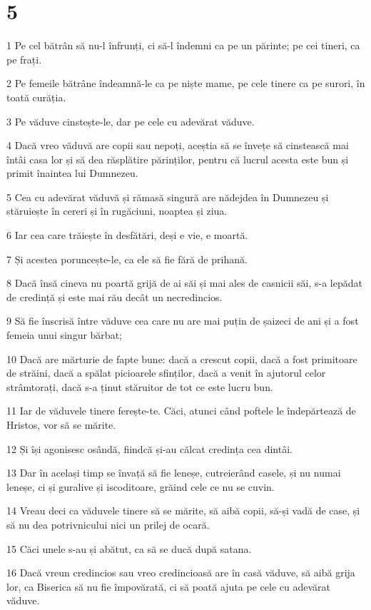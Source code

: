 \chapter{5}

\par 1 Pe cel bătrân să nu-l înfrunți, ci să-l îndemni ca pe un părinte; pe cei tineri, ca pe frați.
\par 2 Pe femeile bătrâne îndeamnă-le ca pe niște mame, pe cele tinere ca pe surori, în toată curăția.
\par 3 Pe văduve cinstește-le, dar pe cele cu adevărat văduve.
\par 4 Dacă vreo văduvă are copii sau nepoți, aceștia să se învețe să cinstească mai întâi casa lor și să dea răsplătire părinților, pentru că lucrul acesta este bun și primit înaintea lui Dumnezeu.
\par 5 Cea cu adevărat văduvă și rămasă singură are nădejdea în Dumnezeu și stăruiește în cereri și în rugăciuni, noaptea și ziua.
\par 6 Iar cea care trăiește în desfătări, deși e vie, e moartă.
\par 7 Și acestea poruncește-le, ca ele să fie fără de prihană.
\par 8 Dacă însă cineva nu poartă grijă de ai săi și mai ales de casnicii săi, s-a lepădat de credință și este mai rău decât un necredincios.
\par 9 Să fie înscrisă între văduve cea care nu are mai puțin de șaizeci de ani și a fost femeia unui singur bărbat;
\par 10 Dacă are mărturie de fapte bune: dacă a crescut copii, dacă a fost primitoare de străini, dacă a spălat picioarele sfinților, dacă a venit în ajutorul celor strâmtorați, dacă s-a ținut stăruitor de tot ce este lucru bun.
\par 11 Iar de văduvele tinere ferește-te. Căci, atunci când poftele le îndepărtează de Hristos, vor să se mărite.
\par 12 Și își agonisesc osândă, fiindcă și-au călcat credința cea dintâi.
\par 13 Dar în același timp se învață să fie leneșe, cutreierând casele, și nu numai leneșe, ci și guralive și iscoditoare, grăind cele ce nu se cuvin.
\par 14 Vreau deci ca văduvele tinere să se mărite, să aibă copii, să-și vadă de case, și să nu dea potrivnicului nici un prilej de ocară.
\par 15 Căci unele s-au și abătut, ca să se ducă după satana.
\par 16 Dacă vreun credincios sau vreo credincioasă are în casă văduve, să aibă grija lor, ca Biserica să nu fie împovărată, ci să poată ajuta pe cele cu adevărat văduve.
